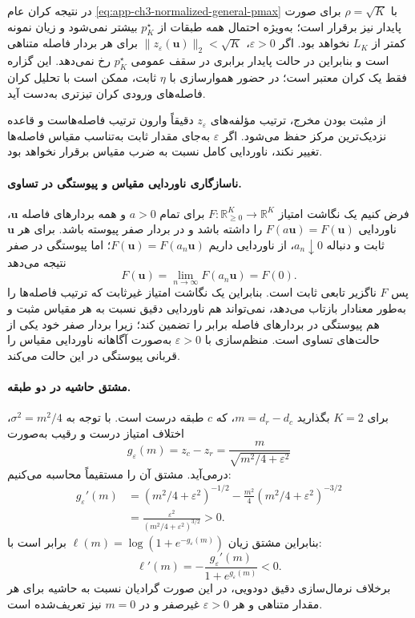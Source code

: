 در نتیجه کران عام
\eqref{eq:app-ch3-normalized-general-pmax}
با $\rho=\sqrt K$
برای صورت پایدار نیز
برقرار است؛ به‌ویژه
احتمال همه طبقات از
$p_K^\star$ بیشتر نمی‌شود
و زیان نمونه کمتر از
$L_K$ نخواهد بود.
اگر $\varepsilon>0$،
$\|z_\varepsilon(\mathbf u)\|_2<\sqrt K$
برای هر بردار فاصله
متناهی است و بنابراین
در حالت پایدار برابری
در سقف عمومی
$p_K^\star$ رخ نمی‌دهد.
این گزاره فقط یک کران
معتبر است؛ در حضور
هموارسازی با $\eta$ ثابت،
ممکن است با تحلیل کران
فاصله‌های ورودی
کران تیزتری به‌دست آید.

از مثبت بودن مخرج، ترتیب مؤلفه‌های
$z_\varepsilon$ دقیقاً وارون
ترتیب فاصله‌هاست و قاعده
نزدیک‌ترین مرکز حفظ می‌شود.
اگر $\varepsilon$ به‌جای مقدار ثابت
به‌تناسب مقیاس فاصله‌ها تغییر
نکند، ناوردایی کامل نسبت به
ضرب مقیاس برقرار نخواهد بود.


\paragraph{ناسازگاری ناوردایی مقیاس و پیوستگی در تساوی.}
فرض کنیم یک نگاشت امتیاز
$F:\mathbb R_{\ge0}^K\to\mathbb R^K$
برای تمام $a>0$ و همه بردارهای
فاصله $\mathbf u$، ناوردایی
$F(a\mathbf u)=F(\mathbf u)$ را داشته باشد
و در بردار صفر پیوسته باشد.
برای هر $\mathbf u$ ثابت و دنباله
$a_n\downarrow0$، از ناوردایی
داریم $F(\mathbf u)=F(a_n\mathbf u)$؛
اما پیوستگی در صفر نتیجه می‌دهد
\[
F(\mathbf u)=\lim_{n\to\infty}F(a_n\mathbf u)=F(0).
\]
پس $F$ ناگزیر تابعی ثابت است.
بنابراین یک نگاشت امتیاز
غیرثابت که ترتیب فاصله‌ها را
به‌طور معنادار بازتاب می‌دهد،
نمی‌تواند هم ناوردایی دقیق
نسبت به هر مقیاس مثبت و هم
پیوستگی در بردارهای فاصله برابر
را تضمین کند؛ زیرا بردار صفر
خود یکی از حالت‌های تساوی است.
منظم‌سازی با $\varepsilon>0$
به‌صورت آگاهانه ناوردایی مقیاس
را قربانی پیوستگی در این حالت
می‌کند.


\paragraph{مشتق حاشیه در دو طبقه.}
برای $K=2$ بگذارید
$m=d_r-d_c$، که $c$ طبقه درست است.
با توجه به
$\sigma^2=m^2/4$،
اختلاف امتیاز درست و رقیب
به‌صورت
\[
g_\varepsilon(m)
=z_c-z_r
=\frac{m}{\sqrt{m^2/4+\varepsilon^2}}
\]
درمی‌آید. مشتق آن را مستقیماً
محاسبه می‌کنیم:
\[
\begin{aligned}
g_\varepsilon'(m)
&=(m^2/4+\varepsilon^2)^{-1/2}
-\frac{m^2}{4}(m^2/4+\varepsilon^2)^{-3/2}\\
&=\frac{\varepsilon^2}
{(m^2/4+\varepsilon^2)^{3/2}}>0.
\end{aligned}
\]
بنابراین مشتق زیان
$\ell(m)=\log(1+e^{-g_\varepsilon(m)})$
برابر است با:
\[
\ell'(m)
=-\frac{g_\varepsilon'(m)}
{1+e^{g_\varepsilon(m)}}<0.
\]
برخلاف نرمال‌سازی دقیق دودویی،
در این صورت گرادیان نسبت به
حاشیه برای هر مقدار متناهی
و هر $\varepsilon>0$ غیرصفر
و در $m=0$ نیز تعریف‌شده است.

